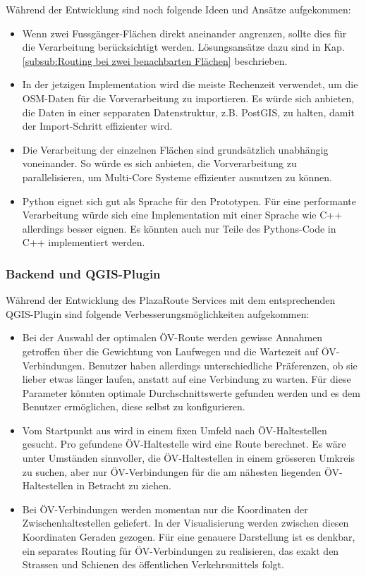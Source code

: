 Während der Entwicklung sind noch folgende Ideen und Ansätze aufgekommen:

\begin{itemize}
    \item Wenn zwei Fussgänger-Flächen direkt aneinander angrenzen, sollte dies für die Verarbeitung berücksichtigt werden. Lösungsansätze dazu sind in Kap. \ref{subsub:Routing bei zwei benachbarten Flächen} beschrieben.
    \item In der jetzigen Implementation wird die meiste Rechenzeit verwendet, um die \ac{OSM}-Daten für die Vorverarbeitung zu importieren. Es würde sich anbieten, die Daten in einer sepparaten Datenstruktur, z.B. PostGIS, zu halten, damit der Import-Schritt effizienter wird.
    \item Die Verarbeitung der einzelnen Flächen sind grundsätzlich unabhängig voneinander. So würde es sich anbieten, die Vorverarbeitung zu parallelisieren, um Multi-Core Systeme effizienter ausnutzen zu können.
    \item Python eignet sich gut als Sprache für den Prototypen. Für eine performante Verarbeitung würde sich eine Implementation mit einer Sprache wie C++ allerdings besser eignen. Es könnten auch nur Teile des Pythons-Code in C++ implementiert werden.
\end{itemize}

\subsubsection{Backend und QGIS-Plugin}
\label{subsub:Weiterentwicklung_Backend_QGIS}

Während der Entwicklung des PlazaRoute Services mit dem entsprechenden QGIS-Plugin sind folgende Verbesserungsmöglichkeiten aufgekommen:

\begin{itemize}
    \item Bei der Auswahl der optimalen ÖV-Route werden gewisse Annahmen getroffen über die Gewichtung von Laufwegen und die Wartezeit auf ÖV-Verbindungen. Benutzer haben allerdings unterschiedliche Präferenzen, ob sie lieber etwas länger laufen, anstatt auf eine Verbindung zu warten. Für diese Parameter könnten optimale Durchschnittswerte gefunden werden und es dem Benutzer ermöglichen, diese selbst zu konfigurieren.
    \item Vom Startpunkt aus wird in einem fixen Umfeld nach ÖV-Haltestellen gesucht. Pro gefundene ÖV-Haltestelle wird eine Route berechnet. Es wäre unter Umständen sinnvoller, die ÖV-Haltestellen in einem grösseren Umkreis zu suchen, aber nur ÖV-Verbindungen für die am nähesten liegenden ÖV-Haltestellen in Betracht zu ziehen.
    \item Bei ÖV-Verbindungen werden momentan nur die Koordinaten der Zwischenhaltestellen geliefert. In der Visualisierung werden zwischen diesen Koordinaten Geraden gezogen. Für eine genauere Darstellung ist es denkbar, ein separates Routing für ÖV-Verbindungen zu realisieren, das exakt den Strassen und Schienen des öffentlichen Verkehrsmittels folgt.
\end{itemize}
